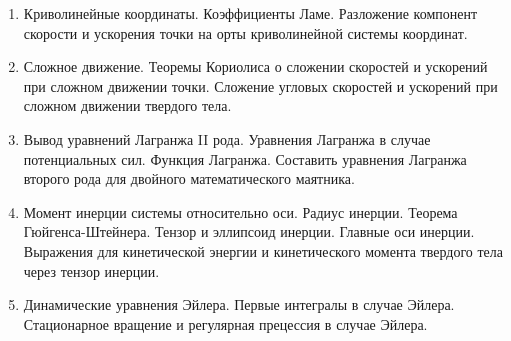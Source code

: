 %
%

\begin{enumerate}

\item Криволинейные координаты. Коэффициенты Ламе. Разложение компонент скорости и ускорения точки на орты криволинейной системы координат. 

\item Сложное движение. Теоремы Кориолиса о сложении скоростей и ускорений при сложном движении точки. Сложение угловых скоростей и ускорений при сложном движении твердого тела.

\item Вывод уравнений Лагранжа II рода. Уравнения Лагранжа в случае потенциальных сил. Функция Лагранжа. Составить уравнения Лагранжа второго рода для двойного математического маятника.

\item Момент инерции системы относительно оси. Радиус инерции. Теорема Гюйгенса-Штейнера. Тензор и эллипсоид инерции. Главные оси инерции. Выражения для кинетической энергии и кинетического момента твердого тела через тензор инерции.

\item Динамические уравнения Эйлера. Первые интегралы в случае Эйлера. Стационарное вращение и регулярная прецессия в случае Эйлера. 


\end{enumerate}





